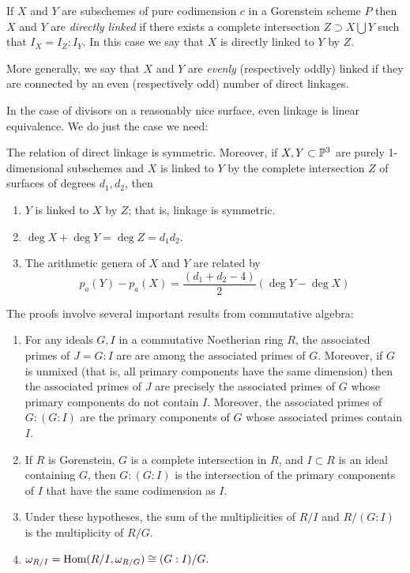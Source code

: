 \begin{definition}
If $X$ and $Y$ are subschemes of pure codimension $c$ in a Gorenstein scheme $P$ then $X$ and $Y$ are \emph{directly linked} if there exists a complete intersection $Z \supset X\bigcup Y$ such that $I_{X} = I_{Z}:I_{Y}$. In this case we say that $X$ is directly linked to $Y$ by $Z$. 

More generally, we say that $X$ and $Y$ are \emph{evenly} (respectively oddly) linked if they are
connected by an even (respectively odd) number of direct linkages.\end{definition}

In the case of divisors on a reasonably nice surface, even linkage is linear equivalence. We do just the case we need:



\begin{theorem}\label{justification of general linkage} The relation of direct linkage is symmetric. Moreover, if $X,Y\subset {\mathbb P}^{3}$ are purely 1-dimensional subschemes and $X$ is linked to $Y$ by the complete intersection $Z$ of surfaces of degrees $d_{1}, d_{2}$, then
\begin{enumerate}
\item $Y$ is linked to $X$ by $Z$; that is, linkage is symmetric.
 \item $\deg X+\deg Y = \deg Z = d_{1}d_{2}$.
 \item  The arithmetic genera of $X$ and $Y$ are related by
$$
p_{a}(Y) - p_{a}(X) =\frac{(d_{1}+d_{2}-4)}{2} (\deg Y - \deg X)
$$
\end{enumerate}
 \end{theorem}
 
 The proofs involve several important results from commutative algebra:
 
\begin{theorem} \label{double colon}
\begin{enumerate}
\item For any ideals $G,I$ in a commutative Noetherian ring $R$, the associated primes of  $J = G:I$ are  are among the associated primes of $G$. Moreover, if $G$ is unmixed (that is, all primary components have the same dimension) then  
the associated primes of $J$ are precisely the associated primes of $G$ whose primary components do not contain $I$.
Moreover, the associated primes of $G:(G:I)$ are the primary components of $G$ whose associated primes contain $I$.

\item  If $R$ is Gorenstein, $G$ is a complete intersection in $R$, and $I\subset R$ is an ideal containing $G$, then $G:(G:I)$ is the 
intersection of the primary components of $I$ that have the same codimension as $I$. 

\item Under these hypotheses, the sum of the multiplicities of $R/I$ and $R/(G:I)$ is the multiplicity of $R/G$.

\item 
$
\omega_{R/I} = \operatorname{Hom}(R/I, \omega_{R/G})\cong (G:I)/G.
$\\
\end{enumerate}
\end{theorem}

